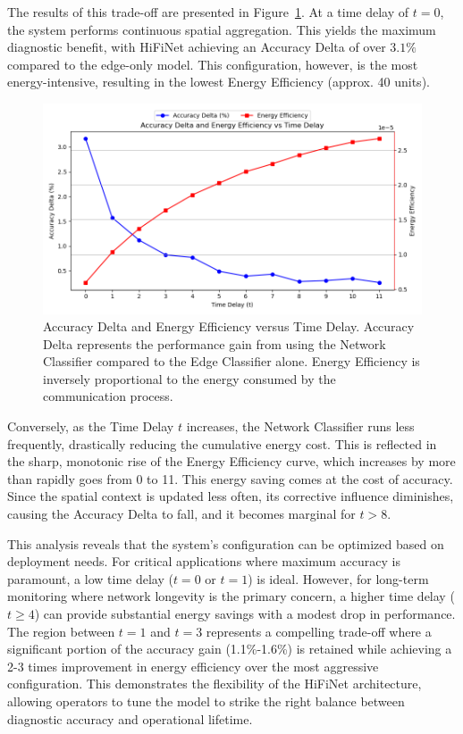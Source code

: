 The results of this trade-off are presented in Figure~\ref{fig:accuracy_tradeoff}. At a time delay of \(t=0\), the system performs continuous spatial aggregation. This yields the maximum diagnostic benefit, with HiFiNet achieving an Accuracy Delta of over \(3.1\%\) compared to the edge-only model. This configuration, however, is the most energy-intensive, resulting in the lowest Energy Efficiency (approx. 40 units).

\begin{figure}
  \centering
  \includegraphics[width=\textwidth]{images/accuracy_tradeoff.png}
  \caption{Accuracy Delta and Energy Efficiency versus Time Delay.  Accuracy Delta represents the performance gain from using the Network Classifier compared to the Edge Classifier alone. Energy Efficiency is inversely proportional to the energy consumed by the communication process.}
  \label{fig:accuracy_tradeoff}
\end{figure}

Conversely, as the Time Delay \(t\) increases, the Network Classifier runs less frequently, drastically reducing the cumulative energy cost. This is reflected in the sharp, monotonic rise of the Energy Efficiency curve, which increases by more than rapidly goes from 0 to 11. This energy saving comes at the cost of accuracy. Since the spatial context is updated less often, its corrective influence diminishes, causing the Accuracy Delta to fall,  and it becomes marginal for $t > 8$.

This analysis reveals that the system's configuration can be optimized based on deployment needs. For critical applications where maximum accuracy is paramount, a low time delay ($t=0$ or $t=1$) is ideal. However, for long-term monitoring where network longevity is the primary concern, a higher time delay (\(t\ge4\)) can provide substantial energy savings with a modest drop in performance. The region between \(t=1\) and \(t=3\) represents a compelling trade-off where a significant portion of the accuracy gain (1.1\%-1.6\%) is retained while achieving a 2-3 times improvement in energy efficiency over the most aggressive configuration. This demonstrates the flexibility of the HiFiNet architecture, allowing operators to tune the model to strike the right balance between diagnostic accuracy and operational lifetime.
